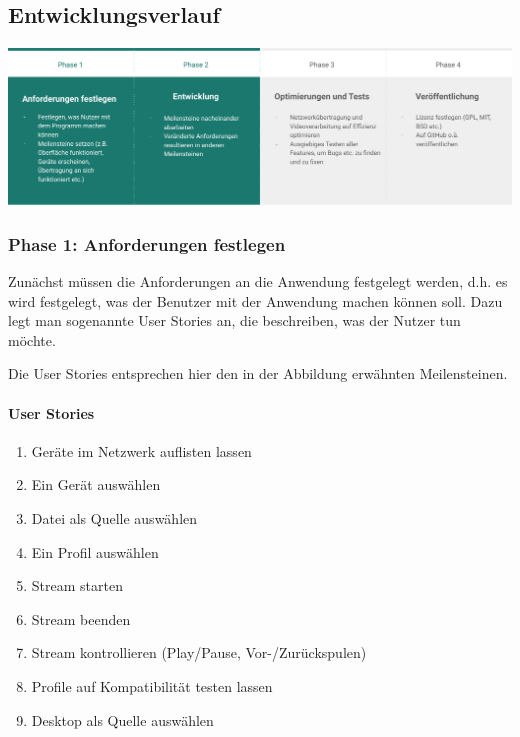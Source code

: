 \documentclass{article}
\begin{document}
    \newpage

    \subsection{Entwicklungsverlauf}\label{subsec:entwicklungsverlauf}
    \includegraphics[width=\textwidth]{Progress.pdf}

    \subsubsection{Phase 1: Anforderungen festlegen}\label{subsubsec:phase-1:-anforderungen-festlegen}

    Zunächst müssen die Anforderungen an die Anwendung festgelegt werden, d.h. es wird festgelegt, was der Benutzer mit der Anwendung machen können soll.
    Dazu legt man sogenannte User Stories an, die beschreiben, was der Nutzer tun möchte.

    Die User Stories entsprechen hier den in der Abbildung erwähnten Meilensteinen.

    \paragraph{User Stories}
    \begin{enumerate}
        \item {Geräte im Netzwerk auflisten lassen}
        \item {Ein Gerät auswählen}
        \item {Datei als Quelle auswählen}
        \item {Ein Profil auswählen}
        \item {Stream starten}
        \item {Stream beenden}
        \item {Stream kontrollieren (Play/Pause, Vor-/Zurückspulen)}
        \item {Profile auf Kompatibilität testen lassen}
        \item {Desktop als Quelle auswählen}
    \end{enumerate}
\end{document}
